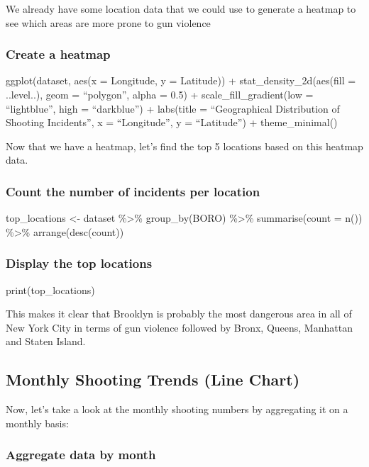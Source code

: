 \documentclass[
]{article}
\begin{document}
We already have some location data that we could use to generate a
heatmap to see which areas are more prone to gun violence

\subsubsection{Create a heatmap}\label{create-a-heatmap}

ggplot(dataset, aes(x = Longitude, y = Latitude)) +
stat\_density\_2d(aes(fill = ..level..), geom = ``polygon'', alpha =
0.5) + scale\_fill\_gradient(low = ``lightblue'', high = ``darkblue'') +
labs(title = ``Geographical Distribution of Shooting Incidents'', x =
``Longitude'', y = ``Latitude'') + theme\_minimal()

Now that we have a heatmap, let's find the top 5 locations based on this
heatmap data.

\subsubsection{Count the number of incidents per
location}\label{count-the-number-of-incidents-per-location}

top\_locations \textless- dataset \%\textgreater\% group\_by(BORO)
\%\textgreater\% summarise(count = n()) \%\textgreater\%
arrange(desc(count))

\subsubsection{Display the top
locations}\label{display-the-top-locations}

print(top\_locations)

This makes it clear that Brooklyn is probably the most dangerous area in
all of New York City in terms of gun violence followed by Bronx, Queens,
Manhattan and Staten Island.

\subsection{Monthly Shooting Trends (Line
Chart)}\label{monthly-shooting-trends-line-chart}

Now, let's take a look at the monthly shooting numbers by aggregating it
on a monthly basis:

\subsubsection{Aggregate data by month}\label{aggregate-data-by-month}
\end{document}
